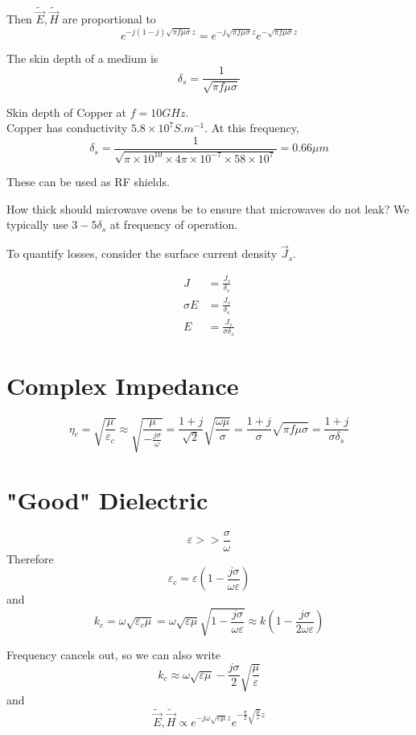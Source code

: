\documentclass[12pt]{article}
\begin{document}
Then $\tilde{\vec E}, \tilde{\vec H}$ are proportional to
$$e^{-j(1-j)\sqrt{\pi f\mu\sigma}z} = e^{-j\sqrt{\pi f\mu\sigma}z} e^{-\sqrt{\pi f\mu\sigma}z}$$

\begin{defn}
    The skin depth of a medium is
    $$\delta_s = \frac{1}{\sqrt{\pi f\mu\sigma}}$$
\end{defn}

\begin{ex}
    Skin depth of Copper at $f = 10\unit{GHz}$. \\
    Copper has conductivity $5.8 \times 10^7\unit{S.m^{-1}}$. At this frequency,
    $$\delta_s = \frac{1}{\sqrt{\pi \times 10^{10} \times 4\pi \times 10^{-7} \times 58 \times 10^7}} = 0.66\unit{\mu m}$$
\end{ex}

These can be used as RF shields.

\begin{ex}
    How thick should microwave ovens be to ensure that microwaves do not leak? We typically use $3-5\delta_s$ at frequency of operation.
\end{ex}

To quantify losses, consider the surface current density $\vec J_s$.

\begin{align*}
    J &= \frac{J_s}{\delta_s} \\
    \sigma E &= \frac{J_s}{\delta_s} \\
    E &= \frac{J_s}{\sigma\delta_s}
\end{align*}

\section{Complex Impedance}

$$\eta_c = \sqrt{\frac{\mu}{\varepsilon_c}} \approx \sqrt{\frac{\mu}{-\frac{j\sigma}{\omega}}} = \frac{1+j}{\sqrt{2}}\sqrt{\frac{\omega\mu}{\sigma}} = \frac{1+j}{\sigma}\sqrt{\pi f\mu\sigma} = \frac{1+j}{\sigma\delta_s}$$

\section{"Good" Dielectric}

$$\varepsilon >> \frac{\sigma}{\omega}$$
Therefore
$$\varepsilon_c = \varepsilon\left(1 - \frac{j\sigma}{\omega\varepsilon}\right)$$
and
$$k_c = \omega\sqrt{\varepsilon_c\mu} = \omega\sqrt{\varepsilon\mu}\sqrt{1 - \frac{j\sigma}{\omega\varepsilon}} \approx k\left(1 - \frac{j\sigma}{2\omega\varepsilon}\right)$$

Frequency cancels out, so we can also write
$$k_c \approx \omega\sqrt{\varepsilon\mu} - \frac{j\sigma}{2}\sqrt{\frac{\mu}{\varepsilon}}$$
and
$$\tilde{\vec E},\tilde{\vec H} \propto e^{-j\omega\sqrt{\varepsilon\mu}z}e^{-\frac{\sigma}{2}\sqrt{\frac{\mu}{\varepsilon}}z}$$
\end{document}
